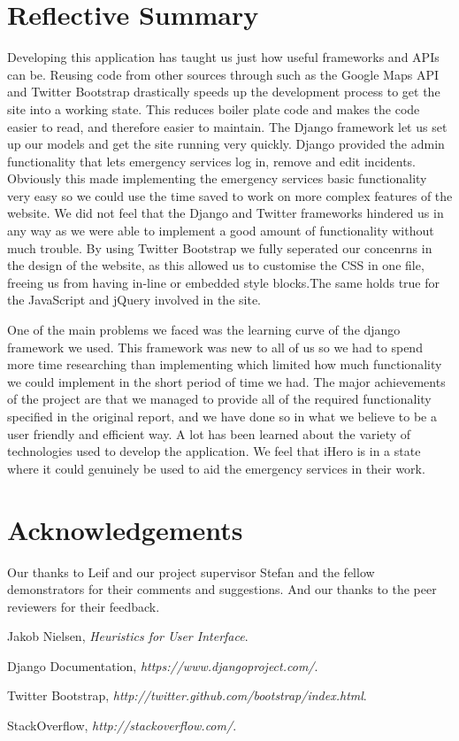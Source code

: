 \documentclass{sig-alt-release2}
\begin{document}
\section{Reflective Summary}
Developing this application has taught us just how useful frameworks and APIs can be. Reusing code from other sources through such as the Google Maps API and Twitter Bootstrap drastically speeds up the development process to get the site into a working state. This reduces boiler plate code and makes the code easier to read, and therefore easier to maintain. The Django framework let us set up our models and get the site running very quickly. Django provided the admin functionality that lets emergency services log in, remove and edit incidents. Obviously this made implementing the emergency services basic functionality very easy so we could use the time saved to work on more complex features of the website. We did not feel that the Django and Twitter frameworks hindered us in any way as we were able to implement a good amount of functionality without much trouble. By using Twitter Bootstrap we fully seperated our concenrns in the design of the website, as this allowed us to customise the CSS in one file, freeing us from having in-line or embedded style blocks.The same holds true for the JavaScript and jQuery involved in the site.

One of the main problems we faced was the learning curve of the django framework we used. This framework was new to all of us so we had to spend more time researching than implementing which limited how much functionality we could implement in the short period of time we had. The major achievements of the project are that we managed to provide all of the required functionality specified in the original report, and we have done so in what we believe to be a user friendly and efficient way. A lot has been learned about the variety of technologies used to develop the application. We feel that iHero is in a state where it could genuinely be used to aid the emergency services in their work. 

\section{Acknowledgements}
Our thanks to Leif and our project supervisor Stefan and the fellow demonstrators for their comments and suggestions. And our thanks to the peer reviewers for their feedback.

\begin{thebibliography}{9}

  Jakob Nielsen,
  \emph{Heuristics for User Interface}.

  Django Documentation,
  \emph{https://www.djangoproject.com/}.

  Twitter Bootstrap,
  \emph{http://twitter.github.com/bootstrap/index.html}.

  StackOverflow,
  \emph{http://stackoverflow.com/}.

\end{thebibliography}
\end{document}
